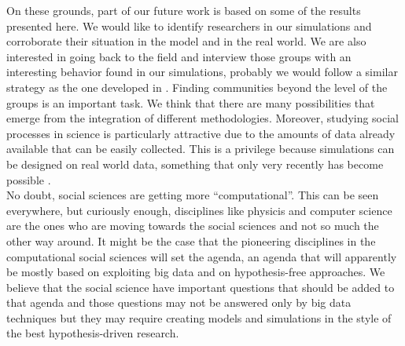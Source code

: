 \documentclass[11pt]{article}
\begin{document}
{{\color{red}On these grounds, part of our future work is based on some of the results presented here. We would like to
identify researchers in our simulations and corroborate their situation in the model and in the real world. We are
also interested in going back to the field and interview those groups with an interesting behavior found in our
simulations, probably we would follow a similar strategy as the one developed in \cite{Haraetal2003}. Finding
communities beyond the level of the groups is an important task. We think that there are many possibilities that emerge
from the integration of different methodologies. Moreover, studying social processes in science is particularly
attractive due to the amounts of data already available that can be easily collected. This is a privilege because
simulations can be designed on real world data, something that only very recently has become possible
\cite{Barabasi2011}.\\


No doubt, social sciences are getting more ``computational''. This can be seen everywhere, but curiously enough,
disciplines like physicis and computer science are the ones who are moving towards the social sciences and not so much
the other way around. It might be the case that the pioneering disciplines in the computational social sciences will set
the agenda, an agenda that will apparently be mostly based on exploiting big data and on hypothesis-free approaches. We
believe that the social science have important questions that should be added to that agenda and those questions may not
be answered only by big data techniques but they may require creating models and simulations in the style of the best
hypothesis-driven research.} 
 

}
\end{document}
